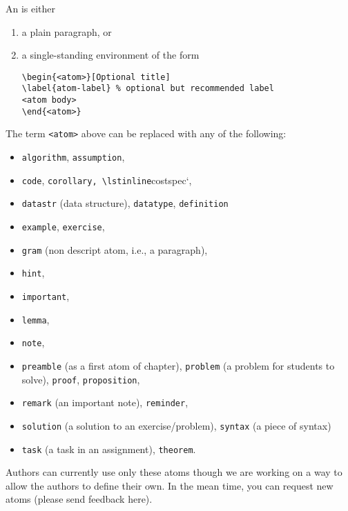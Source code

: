 \begin{definition}[Atom]
An  is either
\begin{enumerate}
\item a plain paragraph, or
\item a single-standing environment of the form

\begin{lstlisting}
\begin{<atom>}[Optional title]
\label{atom-label} % optional but recommended label
<atom body>
\end{<atom>}
\end{lstlisting}
\end{enumerate}


The term \lstinline`<atom>` above can be replaced with any of the following:
\begin{itemize}
\item \lstinline`algorithm`, \lstinline`assumption`,
\item \lstinline`code`, \lstinline`corollary, \lstinline`costspec`,
\item \lstinline`datastr` (data structure), \lstinline`datatype`, \lstinline`definition`
\item \lstinline`example`, \lstinline`exercise`,
\item \lstinline`gram`  (non descript atom, i.e., a paragraph),
\item \lstinline`hint`, 
\item \lstinline`important`, 
\item \lstinline`lemma`,
\item \lstinline`note`,
\item \lstinline`preamble` (as a  first atom of chapter), \lstinline`problem` (a problem for students to solve), \lstinline`proof`, \lstinline`proposition`,
\item \lstinline`remark` (an important note), \lstinline`reminder`,
\item \lstinline`solution` (a solution to an exercise/problem), \lstinline`syntax` (a piece of syntax)
\item \lstinline`task` (a task in an assignment), \lstinline`theorem`.
\end{itemize}
\end{definition}

\begin{note}
Authors can currently use only these atoms though we are working on a way to allow the authors to define their own.  In the mean time, you can request new atoms  (please send feedback here).
\end{note}

